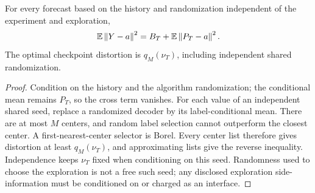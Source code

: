 \begin{lemma}\label{lem:projection}
For every forecast based on the history and randomization independent of the experiment and exploration,
\begin{equation}\label{eq:projection}
 \mathbb E\left\lVert Y-a\right\rVert^2=B_T+\mathbb E\left\lVert P_T-a\right\rVert^2.
\end{equation}
The optimal checkpoint distortion is $q_M(\nu_T)$, including independent shared randomization.
\end{lemma}
\begin{proof}
Condition on the history and the algorithm randomization; the conditional mean remains $P_T$, so the cross term vanishes. For each value of an independent shared seed, replace a randomized decoder by its label-conditional mean. There are at most $M$ centers, and random label selection cannot outperform the closest center. A first-nearest-center selector is Borel. Every center list therefore gives distortion at least $q_M(\nu_T)$, and approximating lists give the reverse inequality. Independence keeps $\nu_T$ fixed when conditioning on this seed. Randomness used to choose the exploration is not a free such seed; any disclosed exploration side-information must be conditioned on or charged as an interface.
\end{proof}


